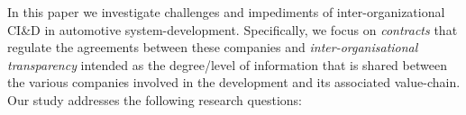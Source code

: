 In this paper we investigate %
challenges and impediments of inter-organizational CI\&D in automotive system-development. 
Specifically, we focus on {\em {} contracts} that regulate the agreements between these companies 
and {\em {inter-organisational} transparency} intended as the degree/level of information that is shared between the various companies %
involved in the development and its associated value-chain. %
Our study %
addresses the following research questions:

%

